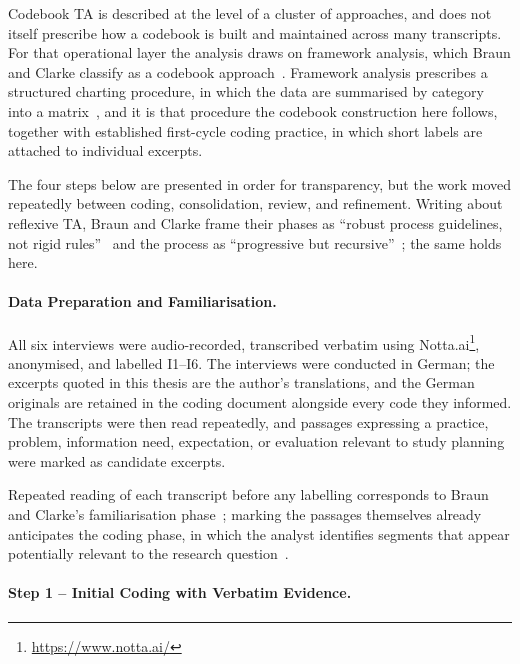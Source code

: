 Codebook TA is described at the level of a cluster of approaches, and does not itself prescribe how a codebook is built and maintained across many transcripts. For that operational layer the analysis draws on framework analysis, which Braun and Clarke classify as a codebook approach~\cite[pp.~244--245]{braun_thematic_2022}. Framework analysis prescribes a structured charting procedure, in which the data are summarised by category into a matrix~\cite{gale_using_2013}, and it is that procedure the codebook construction here follows, together with established first-cycle coding practice, in which short labels are attached to individual excerpts.

The four steps below are presented in order for transparency, but the work moved repeatedly between coding, consolidation, review, and refinement. Writing about reflexive TA, Braun and Clarke frame their phases as \enquote{robust process guidelines, not rigid rules}~\cite[p.~10]{braun_thematic_2022} and the process as \enquote{progressive but recursive}~\cite[p.~36]{braun_thematic_2022}; the same holds here.

\paragraph{Data Preparation and Familiarisation.}
\label{sec:data-preparation}

All six interviews were audio-recorded, transcribed verbatim using Notta.ai\footnote{\url{https://www.notta.ai/}}, anonymised, and labelled I1--I6. The interviews were conducted in German; the excerpts quoted in this thesis are the author's translations, and the German originals are retained in the coding document alongside every code they informed. The transcripts were then read repeatedly, and passages expressing a practice, problem, information need, expectation, or evaluation relevant to study planning were marked as candidate excerpts.

Repeated reading of each transcript before any labelling corresponds to Braun and Clarke's familiarisation phase~\cite[pp.~42--49]{braun_thematic_2022}; marking the passages themselves already anticipates the coding phase, in which the analyst identifies segments that appear potentially relevant to the research question~\cite[p.~35]{braun_thematic_2022}.

\paragraph{Step 1 -- Initial Coding with Verbatim Evidence.}
\label{sec:initial-coding}

